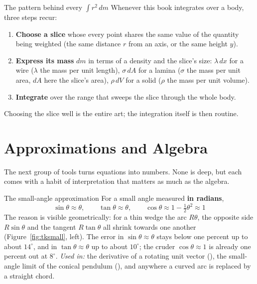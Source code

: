 \begin{methodbox}{The pattern behind every $\int r^2\,dm$}
Whenever this book integrates over a body, three steps recur:
\begin{enumerate}
\item \textbf{Choose a slice} whose every point shares the same value of the quantity being weighted
      (the same distance $r$ from an axis, or the same height $y$).
\item \textbf{Express its mass} $dm$ in terms of a density and the slice's size: $\lambda\,dx$ for a
      wire ($\lambda$ the mass per unit length), $\sigma\,dA$ for a lamina ($\sigma$ the mass per unit
      area, $dA$ here the slice's area), $\rho\,dV$ for a solid ($\rho$ the mass per unit volume).
\item \textbf{Integrate} over the range that sweeps the slice through the whole body.
\end{enumerate}
Choosing the slice well is the entire art; the integration itself is then routine.
\end{methodbox}

\section{Approximations and Algebra}\label{sec:approx}

The next group of tools turns equations into numbers. None is deep, but each comes with a habit of
interpretation that matters as much as the algebra.

\begin{defbox}{The small-angle approximation}
For a small angle measured \textbf{in radians},
\[
\boxed{\;\sin\theta\approx\theta,\qquad \tan\theta\approx\theta,\qquad \cos\theta\approx1-\tfrac12\theta^{2}\approx1\;}
\]
The reason is visible geometrically: for a thin wedge the arc $R\theta$, the opposite side $R\sin\theta$
and the tangent $R\tan\theta$ all shrink towards one another (Figure~\ref{fig:tksmall}, left). The error in $\sin\theta\approx\theta$
stays below one percent up to about $14^\circ$, and in $\tan\theta\approx\theta$ up to about $10^\circ$;
the cruder $\cos\theta\approx1$ is already one percent out at $8^\circ$.
\emph{Used in:} the derivative of a rotating unit vector (), the small-angle limit of
the conical pendulum (), and anywhere a curved arc is replaced by a straight chord.
\end{defbox}

\begin{figure}[htbp]
\centering
{}
\end{figure}

